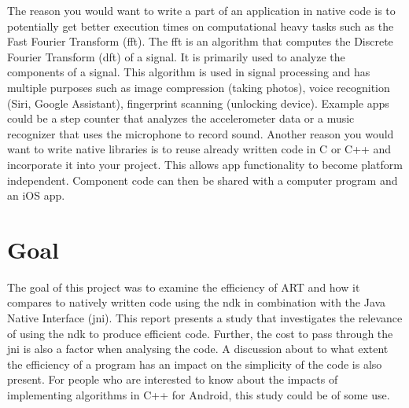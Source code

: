 The reason you would want to write a part of an application in native code is to potentially get better execution times on computational heavy tasks such as the Fast Fourier Transform (\gls{fft}). The \gls{fft} is an algorithm that computes the Discrete Fourier Transform (\gls{dft}) of a signal. It is primarily used to analyze the components of a signal. This algorithm is used in signal processing and has multiple purposes such as image compression (taking photos), voice recognition (Siri, Google Assistant), fingerprint scanning (unlocking device). Example apps could be a step counter that analyzes the accelerometer data or a music recognizer that uses the microphone to record sound. Another reason you would want to write native libraries is to reuse already written code in C or C++ and incorporate it into your project. This allows app functionality to become platform independent. Component code can then be shared with a computer program and an iOS app.


\section{Goal}
The goal of this project was to examine the efficiency of ART and how it compares to natively written code using the \gls{ndk} in combination with the Java Native Interface (\gls{jni}). This report presents a study that investigates the relevance of using the \gls{ndk} to produce efficient code. Further, the cost to pass through the \gls{jni} is also a factor when analysing the code. A discussion about to what extent the efficiency of a program has an impact on the simplicity of the code is also present. For people who are interested to know about the impacts of implementing algorithms in C++ for Android, this study could be of some use.

